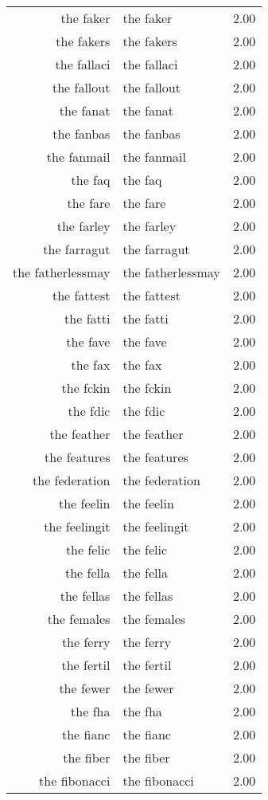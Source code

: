 \begin{table}[ht]
\begin{tabular}{rlr}
  the faker & the faker & 2.00 \\ 
  the fakers & the fakers & 2.00 \\ 
  the fallaci & the fallaci & 2.00 \\ 
  the fallout & the fallout & 2.00 \\ 
  the fanat & the fanat & 2.00 \\ 
  the fanbas & the fanbas & 2.00 \\ 
  the fanmail & the fanmail & 2.00 \\ 
  the faq & the faq & 2.00 \\ 
  the fare & the fare & 2.00 \\ 
  the farley & the farley & 2.00 \\ 
  the farragut & the farragut & 2.00 \\ 
  the fatherlessmay & the fatherlessmay & 2.00 \\ 
  the fattest & the fattest & 2.00 \\ 
  the fatti & the fatti & 2.00 \\ 
  the fave & the fave & 2.00 \\ 
  the fax & the fax & 2.00 \\ 
  the fckin & the fckin & 2.00 \\ 
  the fdic & the fdic & 2.00 \\ 
  the feather & the feather & 2.00 \\ 
  the features & the features & 2.00 \\ 
  the federation & the federation & 2.00 \\ 
  the feelin & the feelin & 2.00 \\ 
  the feelingit & the feelingit & 2.00 \\ 
  the felic & the felic & 2.00 \\ 
  the fella & the fella & 2.00 \\ 
  the fellas & the fellas & 2.00 \\ 
  the females & the females & 2.00 \\ 
  the ferry & the ferry & 2.00 \\ 
  the fertil & the fertil & 2.00 \\ 
  the fewer & the fewer & 2.00 \\ 
  the fha & the fha & 2.00 \\ 
  the fianc & the fianc & 2.00 \\ 
  the fiber & the fiber & 2.00 \\ 
  the fibonacci & the fibonacci & 2.00 \\ 

\end{tabular}
\end{table}
